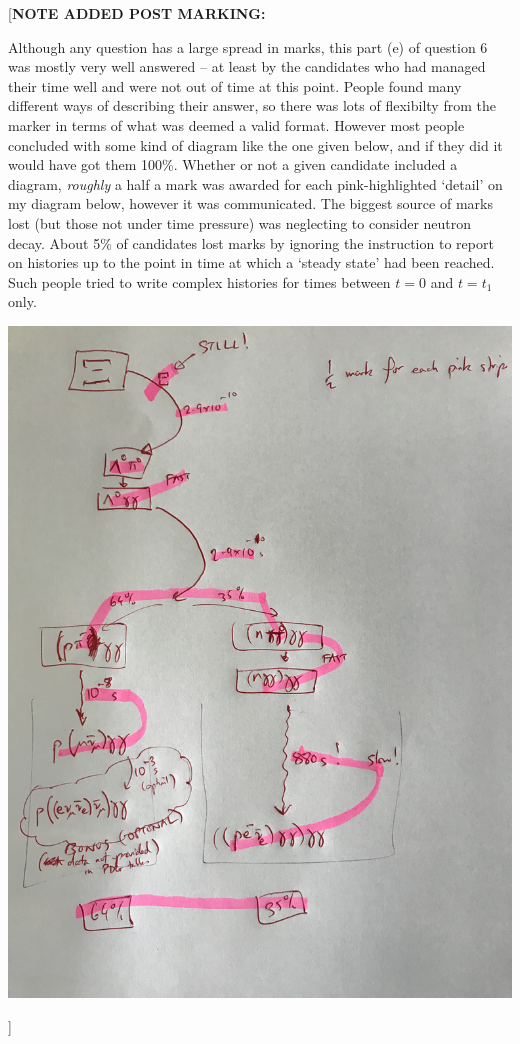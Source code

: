 \documentclass[txfonts]{NSTexam}
\newcommand\POSTMARKING[1]{{

{\color{magenta}
[\textbf{NOTE ADDED POST MARKING:}

#1
]
}
}}
\begin{document}
\begin{questions}
\begin{allparts}
{\POSTMARKING{Although any question has a large spread in marks, this part (e) of question 6 was mostly very well answered -- at least by the candidates who had managed their time well and were not out of time at this point. People found many different ways of describing their answer, so there was lots of flexibilty from the marker in terms of what was deemed a valid format. However most people concluded with some kind of diagram like the one given below, and if they did it would have got them 100\%. Whether or not a given candidate included a diagram, \textit{roughly} a half a mark was awarded for each pink-highlighted `detail' on my diagram below, however it was communicated. The biggest source of marks lost (but those not under time pressure) was neglecting to consider neutron decay.  About 5\% of candidates lost marks by ignoring the instruction to report on histories up to the point in time at which a `steady state' had been reached. Such people tried to write complex histories for times between $t=0$ and $t=t_1$ only. %

\includegraphics[width=1.0\textwidth,angle=-90]{Images/pinks.jpg}
}
}
\end{allparts}


\end{questions}
\end{document}
